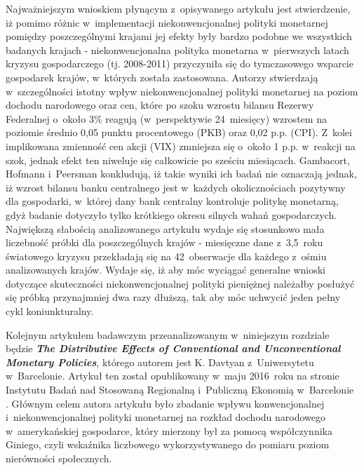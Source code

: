 Najważniejszym wnioskiem płynącym z~opisywanego artykułu jest stwierdzenie, iż pomimo różnic w~implementacji niekonwencjonalnej polityki monetarnej pomiędzy poszczególnymi krajami jej efekty były bardzo podobne we wszystkich badanych krajach - niekonwencjonalna polityka monetarna w~pierwszych latach kryzysu gospodarczego (tj. 2008-2011) przyczyniła się do tymczasowego wsparcie gospodarek krajów, w~których została zastosowana. Autorzy stwierdzają w~szczególności istotny wpływ niekonwencjonalnej polityki monetarnej na poziom dochodu narodowego oraz cen, które po szoku wzrostu bilansu Rezerwy Federalnej o~około 3\% reagują (w~perspektywie 24~miesięcy) wzrostem na poziomie średnio 0,05 punktu procentowego (\acs{PKB}) oraz 0,02 p.p. (\acs{CPI}). Z~kolei implikowana zmienność cen akcji (\acs{VIX}) zmniejsza się o~około 1 p.p. w~reakcji na szok, jednak efekt ten niweluje się całkowicie po sześciu miesiącach.  Gambacort, Hofmann i~Peersman konkludują, iż takie wyniki ich badań nie oznaczają jednak, iż wzrost bilansu banku centralnego jest w~każdych okolicznościach pozytywny dla gospodarki, w~której dany bank centralny kontroluje politykę monetarną, gdyż badanie dotyczyło tylko krótkiego okresu silnych wahań gospodarczych. Największą słabością analizowanego artykułu wydaje się stosunkowo mała liczebność próbki dla poszczególnych krajów - miesięczne dane z~3,5~roku światowego kryzysu przekładają się na 42~obserwacje dla każdego z~ośmiu analizowanych krajów. Wydaje się, iż aby móc wyciągać generalne wnioski dotyczące skuteczności niekonwencjonalnej polityki pieniężnej należałby posłużyć się próbką przynajmniej dwa razy dłuższą, tak aby móc uchwycić jeden pełny cykl koniunkturalny.

Kolejnym artykułem badawczym przeanalizowanym w~niniejszym rozdziale będzie \textbf{\textit{The Distributive Effects of Conventional and Unconventional Monetary Policies}}, którego autorem jest K. Davtyan z~Uniwersytetu w~Barcelonie. Artykuł ten został opublikowany w~maju 2016~roku na stronie Instytutu Badań nad Stosowaną Regionalną i~Publiczną Ekonomią w~Barcelonie \cite{davtyan35}. Głównym celem autora artykułu było zbadanie wpływu konwencjonalnej i~niekonwencjonalnej polityki monetarnej na rozkład dochodu narodowego w~amerykańskiej gospodarce, który mierzony był za pomocą współczynnika Giniego, czyli wskaźnika liczbowego wykorzystywanego do pomiaru poziom nierówności społecznych.

